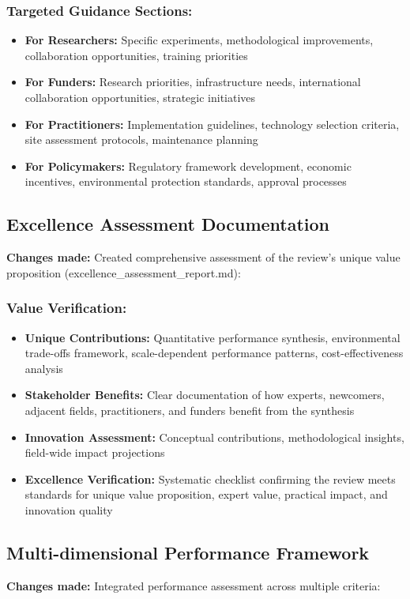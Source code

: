 \documentclass[12pt,a4paper]{article}
\begin{document}
\subsubsection{Targeted Guidance Sections:}
\begin{itemize}
\item \textbf{For Researchers:} Specific experiments, methodological improvements, collaboration opportunities, training priorities
\item \textbf{For Funders:} Research priorities, infrastructure needs, international collaboration opportunities, strategic initiatives
\item \textbf{For Practitioners:} Implementation guidelines, technology selection criteria, site assessment protocols, maintenance planning
\item \textbf{For Policymakers:} Regulatory framework development, economic incentives, environmental protection standards, approval processes
\end{itemize}

\subsection{Excellence Assessment Documentation}
\textbf{Changes made:} Created comprehensive assessment of the review's unique value proposition (excellence\_assessment\_report.md):

\subsubsection{Value Verification:}
\begin{itemize}
\item \textbf{Unique Contributions:} Quantitative performance synthesis, environmental trade-offs framework, scale-dependent performance patterns, cost-effectiveness analysis
\item \textbf{Stakeholder Benefits:} Clear documentation of how experts, newcomers, adjacent fields, practitioners, and funders benefit from the synthesis
\item \textbf{Innovation Assessment:} Conceptual contributions, methodological insights, field-wide impact projections
\item \textbf{Excellence Verification:} Systematic checklist confirming the review meets standards for unique value proposition, expert value, practical impact, and innovation quality
\end{itemize}

\subsection{Multi-dimensional Performance Framework}
\textbf{Changes made:} Integrated performance assessment across multiple criteria:
\end{document}
